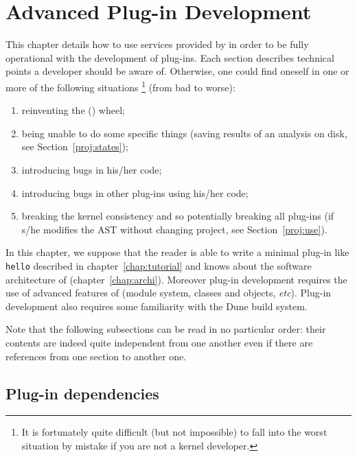 
\chapter{Advanced Plug-in Development}\label{chap:advance}
\lstset{language=Ocaml} %

This chapter details how to use services provided by \framac in order to be
fully operational with the development of plug-ins. Each section describes
technical points a developer should be aware of. Otherwise,
one could find oneself in one or more of the following situations
\footnote{It
  is fortunately quite difficult (but not impossible) to fall into the worst
  situation by mistake if you are not a kernel developer.}
(from bad to worse):
\begin{enumerate}
\item reinventing the (\framac) wheel;
\item being unable to do some specific things (\eg saving
  results of an analysis on disk, see
  Section~\ref{proj:states});
\item introducing bugs in his/her code;
\item introducing bugs in other plug-ins using his/her code;
\item breaking the kernel consistency and so potentially
  breaking all \framac plug-ins (\eg if s/he modifies the
  AST without changing project, see
  Section~\ref{proj:use}).
\end{enumerate}

In this chapter, we suppose that the reader is able to write a minimal plug-in
like \texttt{hello} described in chapter~\ref{chap:tutorial} and
knows about the software architecture of \framac (chapter~\ref{chap:archi}). Moreover
plug-in development requires the use of advanced features of
\caml (module system, classes and objects, \emph{etc}).
Plug-in development also requires some familiarity with the Dune build system.

Note that the following subsections can be read in no particular
order: their contents are indeed quite independent from one another even if
there are references from one section to another one.

\section{Plug-in dependencies}\label{adv:dependencies}

